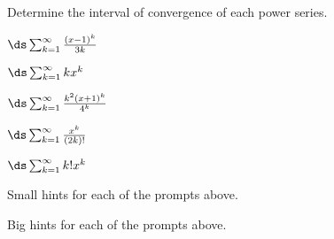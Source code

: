 \begin{activity} \label{8.6.Act1} Determine the interval of convergence of each power series.
\ba
\item $\ds \sum_{k=1}^{\infty} \frac{(x-1)^k}{3k}$
\item $\ds \sum_{k=1}^{\infty} kx^k$
\item $\ds \sum_{k=1}^{\infty} \frac{k^2(x+1)^k}{4^k}$
\item $\ds \sum_{k=1}^{\infty} \frac{x^k}{(2k)!}$
\item $\ds \sum_{k=1}^{\infty} k!x^k$
\ea

\end{activity}

\begin{smallhint}
\ba
	\item Small hints for each of the prompts above.
\ea
\end{smallhint}
\begin{bighint}
\ba
	\item Big hints for each of the prompts above.
\ea
\end{bighint}
